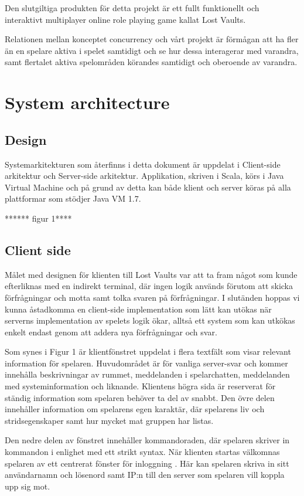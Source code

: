 \documentclass[a4paper]{article}
\begin{document}
Den slutgiltiga produkten för detta projekt är ett fullt funktionellt och interaktivt multiplayer online role playing game kallat Lost Vaults.

Relationen mellan konceptet concurrency och vårt projekt är förmågan att ha fler än en spelare aktiva i spelet samtidigt och se hur dessa interagerar med varandra, samt flertalet 
aktiva spelområden körandes samtidigt och oberoende av varandra.

\section{System architecture}
\subsection{Design}
Systemarkitekturen som återfinns i detta dokument är uppdelat i Client-side arkitektur och Server-side arkitektur. Applikation, skriven i Scala, körs i Java Virtual Machine och på 
grund av detta kan både klient och server köras på alla plattformar som stödjer Java VM 1.7.


****** figur 1****




\subsection{Client side}
Målet med designen för klienten till Lost Vaults var att ta fram något som kunde efterliknas med en indirekt terminal, där ingen logik används förutom att skicka förfrågningar och 
motta samt tolka svaren på förfrågningar. I slutänden hoppas vi kunna åstadkomma en client-side implementation som lätt kan utökas när serverns implementation av spelets logik ökar, 
alltså ett system som kan utkökas enkelt endast genom att addera nya förfrågningar och svar.

Som synes i Figur 1 är klientfönstret uppdelat i flera textfält som visar relevant information för spelaren. Huvudområdet är för vanliga server-svar och kommer innehålla beskrivningar 
av rummet, meddelanden i spelarchatten, meddelanden med systeminformation och liknande. Klientens högra sida är reserverat för ständig information som spelaren behöver ta del av snabbt. 
Den övre delen innehåller information om spelarens egen karaktär, där spelarens liv och stridsegenskaper samt hur mycket mat gruppen har listas. 

Den nedre delen av fönstret innehåller kommandoraden, där spelaren skriver in kommandon i enlighet med ett strikt syntax. När klienten startas välkomnas spelaren 
av ett centrerat fönster för inloggning . Här kan spelaren skriva in sitt användarnamn och lösenord samt IP:n till den server som spelaren vill koppla upp sig mot. 
\end{document}
